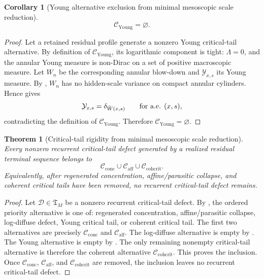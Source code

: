 \documentclass[11pt]{amsart}
\numberwithin{equation}{section}
\theoremstyle{plain}
\newtheorem{theorem}{Theorem}[section]
\newtheorem{corollary}[corollary]{Corollary}
\theoremstyle{definition}
\theoremstyle{remark}
\newcommand{\Cactive}{\mathcal C_{\mathrm{conc}}}
\newcommand{\Caff}{\mathcal C_{\mathrm{aff}}}
\newcommand{\Ccohcrit}{\mathcal C_{\mathrm{cohcrit}}}
\newcommand{\Tcrit}{\mathfrak T_M}
\newcommand{\Cyoung}{\mathcal C_{\mathrm{Young}}}
\begin{document}
\begin{corollary}[Young alternative exclusion from minimal mesoscopic scale reduction]
\label{cor:young-branch-exclusion}
\[
   \Cyoung=\varnothing .
\]
\end{corollary}

\begin{proof}
Let a retained residual profile generate a nonzero Young critical-tail alternative.
By definition of \(\Cyoung\), its logarithmic component is tight:
\(\Lambda=0\), and the annular Young measure is non-Dirac on a set of positive
macroscopic measure.  Let \(W_n\) be the corresponding annular blow-down and
\(\mathcal Y_{x,s}\) its Young measure.  By
,
\(W_n\) has
no hidden-scale variance on compact annular cylinders.  Hence
 gives
\[
   \mathcal Y_{x,s}=\delta_{\bar W(x,s)}
   \qquad\hbox{for a.e. }(x,s),
\]
contradicting the definition of \(\Cyoung\).  Therefore
\(\Cyoung=\varnothing\).
\end{proof}

\begin{theorem}[Critical-tail rigidity from minimal mesoscopic scale reduction]
\label{thm:remaining-rigidity-exact-form}
Every nonzero recurrent critical-tail defect generated by a realized residual
terminal sequence belongs to
\[
   \Cactive\cup\Caff\cup\Ccohcrit .
\]
Equivalently, after regenerated concentration, affine/parasitic collapse, and
coherent critical tails have been removed, no recurrent critical-tail defect
remains.
\end{theorem}

\begin{proof}
Let \(\mathcal D\in\Tcrit\) be a nonzero recurrent critical-tail defect.  By
, the ordered priority alternative is
one of: regenerated concentration, affine/parasitic collapse, log-diffuse defect,
Young critical tail, or coherent critical tail.  The first two alternatives are
precisely \(\Cactive\) and \(\Caff\).  The log-diffuse alternative is empty by
.  The Young alternative is empty by
.  The only remaining nonempty critical-tail
alternative is therefore the coherent alternative \(\Ccohcrit\).  This proves the
inclusion.  Once \(\Cactive\), \(\Caff\), and \(\Ccohcrit\) are removed, the
inclusion leaves no recurrent critical-tail defect.
\end{proof}
\end{document}
